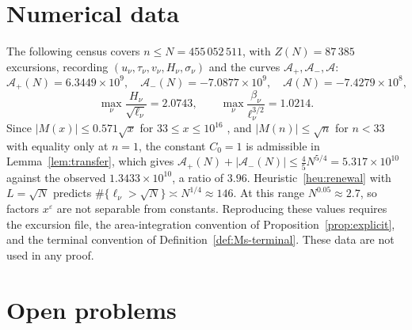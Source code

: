 \documentclass[11pt]{amsart}
\numberwithin{equation}{section}
\theoremstyle{plain}
\theoremstyle{definition}
\theoremstyle{remark}
\newcommand{\Ap}{\mathcal{A}_{+}}
\newcommand{\Am}{\mathcal{A}_{-}}
\newcommand{\Anet}{\mathcal{A}}
\newcommand{\eps}{\varepsilon}
\begin{document}
\section{Numerical data}
\label{sec:data}

The following census covers $n\le N=455\,052\,511$, with $Z(N)=87\,385$
excursions, recording $(u_\nu,\tau_\nu,v_\nu,H_\nu,\sigma_\nu)$ and the
curves $\Ap,\Am,\Anet$:
\begin{equation}
\label{eq:census_values}
  \Ap(N)=6.3449\times10^9,\quad \Am(N)=-7.0877\times10^9,\quad
  \Anet(N)=-7.4279\times10^8,
\end{equation}
\begin{equation}
\label{eq:census_max}
  \max_\nu\frac{H_\nu}{\sqrt{\ell_\nu}}=2.0743,\qquad
  \max_\nu\frac{\beta_\nu}{\ell_\nu^{3/2}}=1.0214 .
\end{equation}
Since $|M(x)|\le0.571\sqrt x$ for $33\le x\le10^{16}$ \cite{Hurst18}, and
$|M(n)|\le\sqrt n$ for $n<33$ with equality only at $n=1$, the
constant $C_0=1$ is admissible in Lemma~\ref{lem:transfer}, which gives
$\Ap(N)+|\Am(N)|\le\frac45N^{5/4}=5.317\times10^{10}$ against the observed
$1.3433\times10^{10}$, a ratio of $3.96$. Heuristic~\ref{heu:renewal} with
$L=\sqrt N$ predicts $\#\{\ell_\nu>\sqrt N\}\asymp N^{1/4}\approx146$. At
this range $N^{0.05}\approx2.7$, so factors $x^\eps$ are not separable from
constants. Reproducing these values requires the excursion file, the
area-integration convention of Proposition~\ref{prop:explicit}, and the
terminal convention of Definition~\ref{def:Ms-terminal}. These data are not used in any proof.

\section{Open problems}
\label{sec:open_questions}
\end{document}
